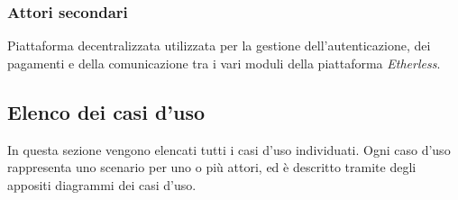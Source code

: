 	\subsubsection{Attori secondari}
		\begin{description}[style=nextline]
			\item[\textbf{Ethereum network}]
				Piattaforma decentralizzata utilizzata per la gestione dell'autenticazione, dei pagamenti e della comunicazione tra i vari moduli della piattaforma \textit{Etherless}. 
		\end{description}
	\pagebreak

\subsection{Elenco dei casi d'uso}
In questa sezione vengono elencati tutti i casi d'uso individuati. Ogni caso d'uso rappresenta uno scenario per uno o più attori, ed è descritto tramite degli appositi diagrammi dei casi d'uso. 














































